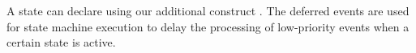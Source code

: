 

\noindent
{}
A state can declare  using our additional construct .
The deferred events are used for state machine execution to delay the processing of low-priority events when a certain state is active.
